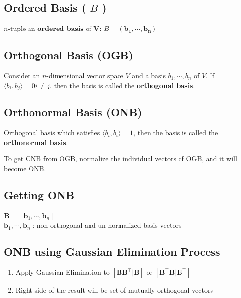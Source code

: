 \subsection{Ordered Basis ( $\mathit{B}$ ) \cite{mfml-1}}\label{ordered basis}
$n$-tuple an \textbf{ordered basis} of $\mathbf{V}$: $\mathit{B} = (\mathbf{b_1, \cdots, b_n})$


\subsection{Orthogonal Basis (OGB) \cite{mfml-1}}\label{Orthogonal Basis (OGB)}
Consider an $n$-dimensional vector space $V$ and a basis ${b_1, \cdots , b_n}$ of $V$. If $\langle b_i , b_j \rangle = 0 i \neq j$, then the basis is called the \textbf{orthogonal basis}.


\subsection{Orthonormal Basis (ONB) \cite{mfml-1}}\label{Orthonormal Basis (ONB)}
Orthogonal basis which satisfies $\langle b_i , b_i \rangle = 1$, then the basis is called the \textbf{orthonormal basis}.

To get ONB from OGB, normalize the individual vectors of OGB, and it will become ONB.

\subsection*{Getting ONB \cite{mfml-1}}
$\mathbf{B} = [\mathbf{b}_1, \cdots, \mathbf{b}_n]$\\
$\mathbf{b}_1, \cdots, \mathbf{b}_n$ : non-orthogonal and un-normalized basis vectors

\subsection{ONB using Gaussian Elimination Process \cite{jstor/2324877-Gram-Schmidt-Orthogonalization-by-Gauss-Elimination}}\label{ONB using Gaussian Elimination Process}

\begin{enumerate}
    \item Apply Gaussian Elimination to $[\mathbf{BB}^\top|\mathbf{B}]$ or $[\mathbf{B^\top B}|\mathbf{B}^\top]$

    \item Right side of the result will be set of mutually orthogonal vectors
\end{enumerate}

